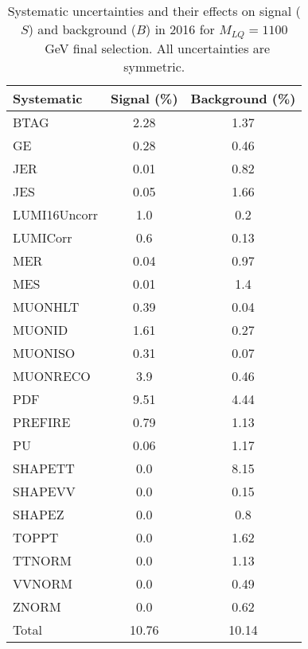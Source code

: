 \begin{table}[htbp]
\begin{center}
\caption{Systematic uncertainties and their effects on signal ($S$) and background ($B$) in 2016 for $M_{LQ}=1100$~GeV final selection. All uncertainties are symmetric.}
\begin{tabular}{lcc}
\hline\hline
Systematic & Signal (\%) & Background (\%) \\ \hline 
BTAG & 2.28 & 1.37\\ 
GE & 0.28 & 0.46\\ 
JER & 0.01 & 0.82\\ 
JES & 0.05 & 1.66\\ 
LUMI16Uncorr & 1.0 & 0.2\\ 
LUMICorr & 0.6 & 0.13\\ 
MER & 0.04 & 0.97\\ 
MES & 0.01 & 1.4\\ 
MUONHLT & 0.39 & 0.04\\ 
MUONID & 1.61 & 0.27\\ 
MUONISO & 0.31 & 0.07\\ 
MUONRECO & 3.9 & 0.46\\ 
PDF & 9.51 & 4.44\\ 
PREFIRE & 0.79 & 1.13\\ 
PU & 0.06 & 1.17\\ 
SHAPETT & 0.0 & 8.15\\ 
SHAPEVV & 0.0 & 0.15\\ 
SHAPEZ & 0.0 & 0.8\\ 
TOPPT & 0.0 & 1.62\\ 
TTNORM & 0.0 & 1.13\\ 
VVNORM & 0.0 & 0.49\\ 
ZNORM & 0.0 & 0.62\\ 
Total & 10.76 & 10.14\\ \hline \hline
\end{tabular}
\label{tab:SysUncertainties_uujj_1100}
\end{center}
\end{table}

